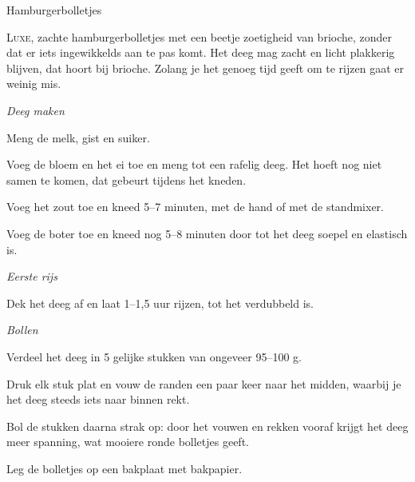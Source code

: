 \begin{recipe}{Hamburgerbolletjes}
\label{recipe:hamburgerbolletjes}


\lettrine{L}{uxe}, zachte hamburgerbolletjes met een beetje zoetigheid van
brioche, zonder dat er iets ingewikkelds aan te pas komt. Het deeg mag zacht
en licht plakkerig blijven, dat hoort bij brioche. Zolang je het genoeg tijd
geeft om te rijzen gaat er weinig mis.

\begin{ingredients}
\end{ingredients}


\medskip
\noindent\textit{Deeg maken}
\begin{steps}
  \item Meng de melk, gist en suiker.
  \item Voeg de bloem en het ei toe en meng tot een rafelig deeg. Het hoeft
        nog niet samen te komen, dat gebeurt tijdens het kneden.
  \item Voeg het zout toe en kneed 5–7 minuten, met de hand of met de
        standmixer.
  \item Voeg de boter toe en kneed nog 5–8 minuten door tot het deeg soepel
        en elastisch is.
\end{steps}

\medskip
\noindent\textit{Eerste rijs}
\begin{steps}
  \item Dek het deeg af en laat 1–1,5 uur rijzen, tot het verdubbeld is.
\end{steps}

\medskip
\noindent\textit{Bollen}
\begin{steps}
  \item Verdeel het deeg in 5 gelijke stukken van ongeveer 95–100 g.
  \item Druk elk stuk plat en vouw de randen een paar keer naar het midden,
        waarbij je het deeg steeds iets naar binnen rekt.
  \item Bol de stukken daarna strak op: door het vouwen en rekken vooraf
        krijgt het deeg meer spanning, wat mooiere ronde bolletjes geeft.
  \item Leg de bolletjes op een bakplaat met bakpapier.
\end{steps}


\end{recipe}
